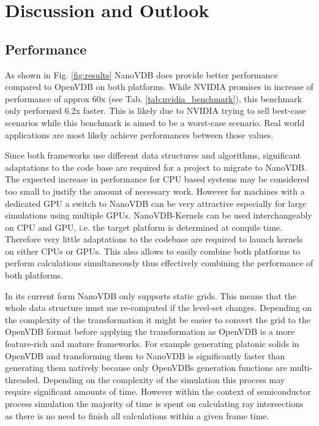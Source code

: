 \section{Discussion and Outlook}
\subsection{Performance}
As shown in Fig. \ref{fig:results} NanoVDB does provide better performance compared to OpenVDB on both platforms.
While NVIDIA promises in increase of performance of approx 60x (see Tab. \ref{tab:nvidia_benchmark}), this benchmark only performed 6.2x faster.
This is likely due to NVIDIA trying to sell best-case scenarios while this benchmark is aimed to be a worst-case scenario. 
Real world applications are most likely achieve performances between those values.

Since both frameworks use different data structures and algorithms, significant adaptations to the code base are required for a project to migrate to NanoVDB. 
The expected increase in performance for CPU based systems may be considered too small to justify the amount of necessary work.
However for machines with a dedicated GPU a switch to NanoVDB can be very attractive especially for large simulations using multiple GPUs.
NanoVDB-Kernels can be used interchangeably on CPU and GPU, i.e. the target platform is determined at compile time.
Therefore very little adaptations to the codebase are required to launch kernels on either CPUs or GPUs.
This also allows to easily combine both platforms to perform calculations simultaneously thus effectively combining the performance of both platforms.

In its current form NanoVDB only supports static grids.
This means that the whole data structure must me re-computed if the level-set changes.
Depending on the complexity of the transformation it might be easier to convert the grid to the OpenVDB format before applying the transformation as OpenVDB is a more feature-rich and mature frameworks. 
For example generating platonic solids in OpenVDB and transforming them to NanoVDB is significantly faster than generating them natively because only OpenVDBs generation functions are multi-threaded. 
Depending on the complexity of the simulation this process may require significant amounts of time.
However within the context of semiconductor process simulation the majority of time is spent on calculating ray intersections as there is no need to finish all calculations within a given frame time. 

